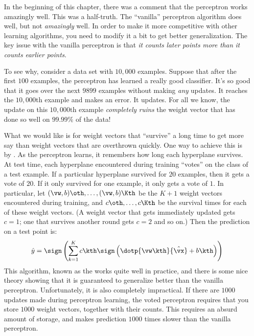 In the beginning of this chapter, there was a comment that the
perceptron works amazingly well.  This was a half-truth.  The
``vanilla'' perceptron algorithm does well, but not \emph{amazingly}
well.  In order to make it more competitive with other learning
algorithms, you need to modify it a bit to get better generalization.
The key issue with the vanilla perceptron is that \emph{it counts
  later points more than it counts earlier points}.

To see why, consider a data set with $10,000$ examples.  Suppose that
after the first $100$ examples, the perceptron has learned a really
good classifier.  It's so good that it goes over the next $9899$
examples without making \emph{any} updates.  It reaches the $10,000$th
example and makes an error.  It updates.  For all we know, the update
on this $10,000$th example \emph{completely ruins} the weight vector
that has done so well on $99.99\%$ of the data!

What we would like is for weight vectors that ``survive'' a long time
to get more say than weight vectors that are overthrown quickly.  One
way to achieve this is by .  As the perceptron learns,
it remembers how long each hyperplane survives.  At test time, each
hyperplane encountered during training ``votes'' on the class of a
test example.  If a particular hyperplane survived for $20$ examples,
then it gets a vote of $20$.  If it only survived for one example, it
only gets a vote of $1$.  In particular, let $(\vw,b)\oth, \dots,
(\vw,b)\Kth$ be the $K+1$ weight vectors encountered during training,
and $c\oth, \dots, c\Kth$ be the survival times for each of these
weight vectors.  (A weight vector that gets immediately updated gets
$c=1$; one that survives another round gets $c=2$ and so on.)  Then
the prediction on a test point is:
\begin{equation} \label{eq:perc:vote}
  \hat y = \sign \left(
    \sum_{k=1}^K c\kth 
      \sign \left(
        \dotp{\vw\kth}{\hat\vx} + b\kth
        \right)
      \right)
\end{equation}
This algorithm, known as the  works quite
well in practice, and there is some nice theory showing that it is
guaranteed to generalize better than the vanilla perceptron.
Unfortunately, it is also completely impractical.  If there are $1000$
updates made during perceptron learning, the voted perceptron requires
that you store $1000$ weight vectors, together with their counts.
This requires an absurd amount of storage, and makes prediction $1000$
times slower than the vanilla perceptron.

